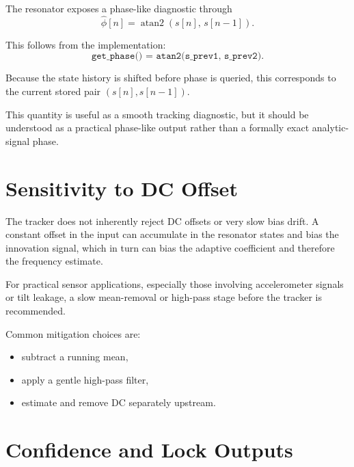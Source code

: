 \documentclass[conference]{IEEEtran}
\begin{document}
    The resonator exposes a phase-like diagnostic through
    \begin{equation}
        \hat\phi[n] = \operatorname{atan2}(s[n],\,s[n-1]).
    \end{equation}

    This follows from the implementation:
    \begin{equation}
        \texttt{get\_phase() = atan2(s\_prev1, s\_prev2)}.
    \end{equation}

    Because the state history is shifted before phase is queried, this
    corresponds to the current stored pair $(s[n],s[n-1])$.

    This quantity is useful as a smooth tracking diagnostic, but it should be
    understood as a practical phase-like output rather than a formally exact
    analytic-signal phase.

    \section{Sensitivity to DC Offset}\label{sec:dc}

    The tracker does not inherently reject DC offsets or very slow bias drift.
    A constant offset in the input can accumulate in the resonator states and
    bias the innovation signal, which in turn can bias the adaptive coefficient
    and therefore the frequency estimate.

    For practical sensor applications, especially those involving accelerometer
    signals or tilt leakage, a slow mean-removal or high-pass stage before the
    tracker is recommended.

    Common mitigation choices are:
    \begin{itemize}[leftmargin=1.4em]
        \item subtract a running mean,
        \item apply a gentle high-pass filter,
        \item estimate and remove DC separately upstream.
    \end{itemize}

    \section{Confidence and Lock Outputs}\label{sec:lock}
\end{document}
